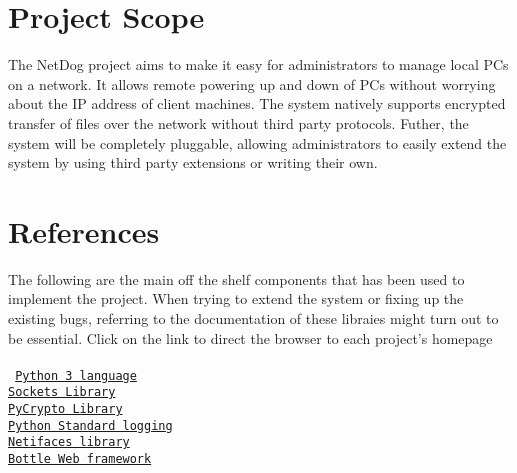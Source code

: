 \documentclass{scrreprt}
\begin{document}
\section{Project Scope}
The NetDog project aims to make it easy for administrators to manage local PCs
on a network. It allows remote powering up and down of PCs without worrying
about the IP address of client machines. The system natively supports encrypted
transfer of files over the network without third party protocols. Futher, the
system will be completely pluggable, allowing administrators to easily extend
the system by using third party extensions or writing their own.

\section{References}
The following are the main off the shelf components that has been used to
implement the project. When trying to extend the system or fixing up the
existing bugs, referring to the documentation of these libraies might turn out
to be essential. Click on the link to direct the browser to each project's
homepage\\\\
\texttt{
    \href{https://docs.python.org/3/tutorial/introduction.html}{Python 3 language}\\
    \href{Sockets: https://docs.python.org/3/howto/sockets.html}{Sockets Library}\\
    \href{https://www.dlitz.net/software/pycrypto}{PyCrypto Library}\\
    \href{https://doc.scrapy.org/en/latest/topics/logging.html}{Python Standard logging}\\
    \href{https://pypi.org/project/netifaces}{Netifaces library}\\
    \href{https://bottlepy.org/docs/dev/}{Bottle Web framework}
}
\\\\
\end{document}
